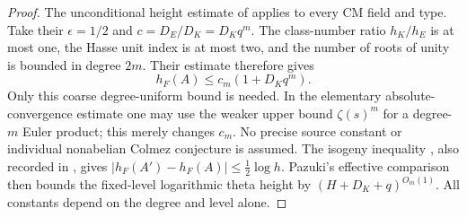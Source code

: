 \documentclass[11pt]{article}
\theoremstyle{definition}
\theoremstyle{remark}
\begin{document}
\begin{proof}
The unconditional height estimate of \citet[Section~7.2.1, equation~(7.7),
Lemma~7.10, pp.~62--63]{VonKanelKret2023} applies to every CM field and type.
Take their $\epsilon=1/2$ and $c=D_E/D_K=D_Kq^m$.  The class-number ratio
$h_K/h_E$ is at most one, the Hasse unit index is at most two, and the number
of roots of unity is bounded in degree $2m$.  Their estimate therefore gives
\[
 h_F(A)\leq c_m(1+D_Kq^m).
\]
Only this coarse degree-uniform bound is needed.  In the elementary
absolute-convergence estimate one may use the weaker upper bound
$\zeta(s)^m$ for a degree-$m$ Euler product; this merely changes $c_m$.
No precise source constant or individual nonabelian Colmez conjecture is
assumed.  The isogeny inequality
\cite[(7.11), p.~67]{VonKanelKret2023}, also recorded in
\cite[Remark~2.3, p.~27]{Pazuki2012}, gives
$|h_F(A')-h_F(A)|\leq\tfrac12\log h$.
Pazuki's effective comparison
\cite[Corollary~1.3, pp.~21--22]{Pazuki2012} then bounds the fixed-level
logarithmic theta height by $(H+D_K+q)^{O_m(1)}$.
All constants depend on the degree and level alone.


\end{proof}
\end{document}
